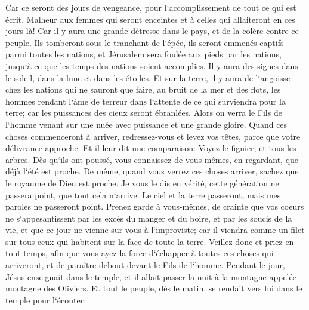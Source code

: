 \verse Car ce seront des jours de vengeance, pour l`accomplissement de tout ce qui est écrit. 
\verse Malheur aux femmes qui seront enceintes et à celles qui allaiteront en ces jours-là! Car il y aura une grande détresse dans le pays, et de la colère contre ce peuple. 
\verse Ils tomberont sous le tranchant de l`épée, ils seront emmenés captifs parmi toutes les nations, et Jérusalem sera foulée aux pieds par les nations, jusqu`à ce que les temps des nations soient accomplies. 
\verse Il y aura des signes dans le soleil, dans la lune et dans les étoiles. Et sur la terre, il y aura de l`angoisse chez les nations qui ne sauront que faire, au bruit de la mer et des flots, 
\verse les hommes rendant l`âme de terreur dans l`attente de ce qui surviendra pour la terre; car les puissances des cieux seront ébranlées. 
\verse Alors on verra le Fils de l`homme venant sur une nuée avec puissance et une grande gloire. 
\verse Quand ces choses commenceront à arriver, redressez-vous et levez vos têtes, parce que votre délivrance approche. 
\verse Et il leur dit une comparaison: Voyez le figuier, et tous les arbres. 
\verse Dès qu`ils ont poussé, vous connaissez de vous-mêmes, en regardant, que déjà l`été est proche. 
\verse De même, quand vous verrez ces choses arriver, sachez que le royaume de Dieu est proche. 
\verse Je vous le dis en vérité, cette génération ne passera point, que tout cela n`arrive. 
\verse Le ciel et la terre passeront, mais mes paroles ne passeront point. 
\verse Prenez garde à vous-mêmes, de crainte que vos coeurs ne s`appesantissent par les excès du manger et du boire, et par les soucis de la vie, et que ce jour ne vienne sur vous à l`improviste; 
\verse car il viendra comme un filet sur tous ceux qui habitent sur la face de toute la terre. 
\verse Veillez donc et priez en tout temps, afin que vous ayez la force d`échapper à toutes ces choses qui arriveront, et de paraître debout devant le Fils de l`homme. 
\verse Pendant le jour, Jésus enseignait dans le temple, et il allait passer la nuit à la montagne appelée montagne des Oliviers. 
\verse Et tout le peuple, dès le matin, se rendait vers lui dans le temple pour l`écouter. 

\chapter{}

